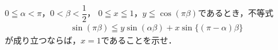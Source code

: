\documentclass[../../main.tex]{subfiles}
\begin{document}
$0\leqq\alpha<\pi$，$\displaystyle0<\beta<\dfrac{1}{2}$，
$0 \leqq x \leqq 1$，$y \leqq \cos(\pi\beta)$であるとき，不等式
\begin{align}
  \sin(\pi\beta) \leqq y\sin(\alpha\beta)+x\sin\{ (\pi-\alpha)\beta \}
\end{align}
が成り立つならば，$x=1$であることを示せ．
\end{document}
